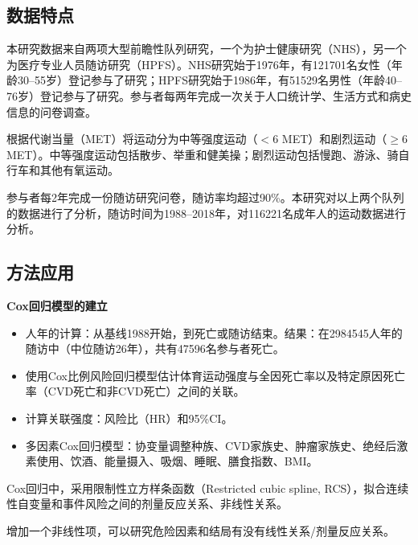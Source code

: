 \subsection{数据特点}
本研究数据来自两项大型前瞻性队列研究，一个为护士健康研究（NHS），另一个为医疗专业人员随访研究（HPFS）。NHS研究始于1976年，有121701名女性（年龄30--55岁）登记参与了研究；HPFS研究始于1986年，有51529名男性（年龄40--76岁）登记参与了研究。参与者每两年完成一次关于人口统计学、生活方式和病史信息的问卷调查。

根据代谢当量（MET）将运动分为中等强度运动（$<6$ MET）和剧烈运动（$\ge6$ MET）。中等强度运动包括散步、举重和健美操；剧烈运动包括慢跑、游泳、骑自行车和其他有氧运动。

参与者每2年完成一份随访研究问卷，随访率均超过90\%。本研究对以上两个队列的数据进行了分析，随访时间为1988--2018年，对116221名成年人的运动数据进行分析。
\begin{center}\end{center}
\subsection{方法应用}
\textbf{Cox回归模型的建立}
\begin{itemize}
\item 人年的计算：从基线1988开始，到死亡或随访结束。结果：在2984545人年的随访中（中位随访26年），共有47596名参与者死亡。
\item 使用Cox比例风险回归模型估计体育运动强度与全因死亡率以及特定原因死亡率（CVD死亡和非CVD死亡）之间的关联。
\item 计算关联强度：风险比（HR）和95\%CI。
\item 多因素Cox回归模型：协变量调整种族、CVD家族史、肿瘤家族史、绝经后激素使用、饮酒、能量摄入、吸烟、睡眠、膳食指数、BMI。
\end{itemize}
Cox回归中，采用限制性立方样条函数（Restricted cubic spline, RCS），拟合连续性自变量和事件风险之间的剂量反应关系、非线性关系。
\begin{annotation}增加一个非线性项，可以研究危险因素和结局有没有线性关系/剂量反应关系。\end{annotation}
